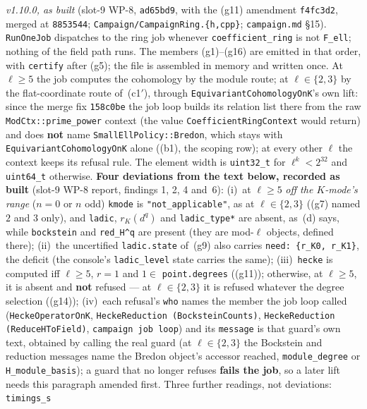 \documentclass[11pt]{article}
\theoremstyle{remark}
\begin{document}
\begingroup\sloppy\emph{v1.10.0, as built} (slot-9 WP-8, \texttt{ad65bd9}, with the (g11)
amendment \texttt{f4fc3d2}, merged at \texttt{8853544}; \texttt{Campaign/CampaignRing.\{h,cpp\}};
\texttt{campaign.md} \S15). \texttt{RunOneJob} dispatches to the ring job whenever
\texttt{coefficient\_ring} is not \texttt{F\_ell}; nothing of the field path runs. The members
(g1)--(g16) are emitted in that order, with \texttt{certify} after (g5); the file is assembled in
memory and written once. At $\ell\ge5$ the job computes the cohomology by the module route; at
$\ell\in\{2,3\}$ by the flat-coordinate route of~(c1$'$), through
\texttt{EquivariantCohomologyOnK}'s own lift: since the merge fix \texttt{158c0be} the job loop
builds its relation list there from the raw \texttt{ModCtx::prime\_power} context (the value
\texttt{CoefficientRingContext} would return) and does \textbf{not} name
\texttt{SmallEllPolicy::Bredon}, which stays with \texttt{EquivariantCohomologyOnK} alone ((b1),
the scoping row); at every other $\ell$ the context keeps its refusal rule. The element width is
\texttt{uint32\_t} for $\ell^k<2^{32}$ and \texttt{uint64\_t} otherwise. \textbf{Four deviations
from the text below, recorded as built} (slot-9 WP-8 report, findings 1, 2, 4 and~6):
(i)~at $\ell\ge5$ \emph{off the $K$-mode's range} ($n=0$ or $n$ odd) \texttt{kmode} is
\texttt{"not\_applicable"}, as at $\ell\in\{2,3\}$ ((g7) named $2$ and $3$ only), and
\texttt{ladic}, $r_K(d^q)$ and \texttt{ladic\_type*} are absent, as~(d) says, while
\texttt{bockstein} and \texttt{red\_H\textasciicircum q} are present (they are mod-$\ell$ objects,
defined there); (ii)~the uncertified \texttt{ladic.state} of~(g9) also carries
\texttt{need: \{r\_K0, r\_K1\}}, the deficit (the console's \texttt{ladic\_level} state carries the
same); (iii)~\texttt{hecke} is computed iff $\ell\ge5$, $r=1$ and $1\in$ \texttt{point.degrees}
((g11)); otherwise, at $\ell\ge5$, it is absent and \textbf{not} refused --- at $\ell\in\{2,3\}$ it
is refused whatever the degree selection ((g14)); (iv)~each refusal's \texttt{who} names the member
the job loop called (\texttt{HeckeOperatorOnK}, \texttt{HeckeReduction (BocksteinCounts)},
\texttt{HeckeReduction (ReduceHToField)}, \texttt{campaign job loop}) and its \texttt{message} is
that guard's own text, obtained by calling the real guard (at $\ell\in\{2,3\}$ the Bockstein and
reduction messages name the Bredon object's accessor reached, \texttt{module\_degree} or
\texttt{H\_module\_basis}); a guard that no longer refuses \textbf{fails the job}, so a later lift
needs this paragraph amended first. Three further readings, not deviations: \texttt{timings\_s}
\end{document}
